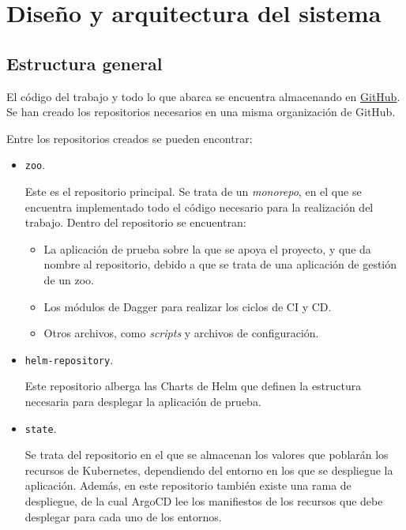 \chapter{Diseño y arquitectura del sistema}

\section{Estructura general}

El código del trabajo y todo lo que abarca se encuentra almacenando en \href{https://github.com/orgs/vieites-tfg/repositories?type=source}{GitHub}. Se han creado los repositorios necesarios en una misma organización de GitHub.

Entre los repositorios creados se pueden encontrar:

\begin{itemize}
  \item \texttt{zoo}.

    Este es el repositorio principal. Se trata de un \textit{monorepo}, en el que se encuentra implementado todo el código necesario para la realización del trabajo. Dentro del repositorio se encuentran:
    \begin{itemize}
      \item La aplicación de prueba sobre la que se apoya el proyecto, y que da nombre al repositorio, debido a que se trata de una aplicación de gestión de un zoo.
      \item Los módulos de Dagger para realizar los ciclos de CI y CD.
      \item Otros archivos, como \textit{scripts} y archivos de configuración.
    \end{itemize}

  \item \texttt{helm-repository}.

    Este repositorio alberga las Charts de Helm que definen la estructura necesaria para desplegar la aplicación de prueba.

  \item \texttt{state}.

    Se trata del repositorio en el que se almacenan los valores que poblarán los recursos de Kubernetes, dependiendo del entorno en los que se despliegue la aplicación. Además, en este repositorio también existe una rama de despliegue, de la cual ArgoCD lee los manifiestos de los recursos que debe desplegar para cada uno de los entornos.
\end{itemize}

